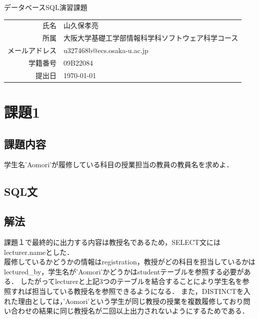 \documentclass[dvipdfmx]{jarticle}
\begin{document}
\begin{titlepage}
    \begin{center}
        {\huge データベースSQL演習課題}
        \vspace{180pt}\\
        \begin{tabular}{rl}
            氏名 & 山久保孝亮\\
            所属 & 大阪大学基礎工学部情報科学科ソフトウェア科学コース\\
            メールアドレス & u327468b@ecs.osaka-u.ac.jp\\
            学籍番号 & 09B22084\\
            提出日 & \today\\
        \end{tabular}
    \end{center}
\end{titlepage}
\section{課題1}
\subsection{課題内容}
学生名'Aomori'が履修している科目の授業担当の教員の教員名を求めよ．
\subsection{SQL文}

\subsection{解法}
課題１で最終的に出力する内容は教授名であるため，SELECT文にはlecturer.nameとした．\\
履修しているかどうかの情報はregistration，教授がどの科目を担当しているかはlectured\_by，学生名が'Aomori'かどうかはstudentテーブルを参照する必要がある．
したがってlecturerと上記3つのテーブルを結合することにより学生名を参照すれば担当している教授名を参照できるようになる．
また，DISTINCTを入れた理由としては，'Aomori'という学生が同じ教授の授業を複数履修しており問い合わせの結果に同じ教授名が二回以上出力されないようにするためである．
\end{document}
